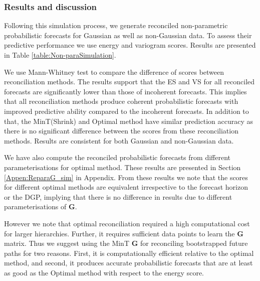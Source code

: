 \documentclass[12pt]{article}
\theoremstyle{definition}
\begin{document}
\subsubsection{Results and discussion}

Following this simulation process, we generate reconciled non-parametric probabilistic forecasts for Gaussian as well as non-Gaussian data. To assess their predictive performance we use energy and variogram scores. Results are presented in Table \ref{table:Non-paraSimulation}.

We use Mann-Whitney test to compare the difference of scores between reconciliation methods. The results support that the ES and VS for all reconciled forecasts are significantly lower than those of incoherent forecasts. This implies that all reconciliation methods produce coherent probabilistic forecasts with improved predictive ability compared to the incoherent forecasts. In addition to that, the MinT(Shrink) and Optimal method have similar prediction accuracy as there is no significant difference between the scores from these reconciliation methods. Results are consistent for both Gaussian and non-Gaussian data. 

We have also compute the reconciled probabilistic forecasts from different parameterisations for optimal method. These results are presented in Section \ref{Appen:ReparaG_sim} in Appendix. From these results we note that the scores for different optimal methods are equivalent irrespective to the forecast horizon or the DGP, implying that there is no difference in results due to different parameterisations of $\bm{G}$.

However we note that optimal reconciliation required a high computational cost for larger hierarchies. Further, it requires sufficient data points to learn the $\bm{G}$ matrix. Thus we suggest using the MinT $\bm{G}$ for reconciling bootstrapped future paths for two reasons. First, it is computationally efficient relative to the optimal method, and second, it produces accurate probabilistic forecasts that are at least as good as the Optimal method with respect to the energy score.
\end{document}
